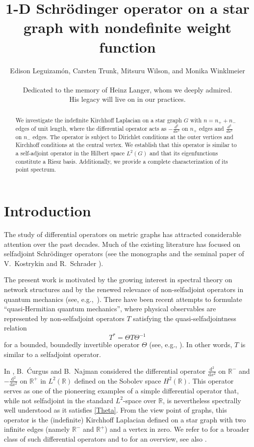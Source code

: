 \documentclass{article}
\title{1-D  Schr\"odinger operator on a star graph with nondefinite weight function}
\author{Edison Leguizam\'on, Carsten Trunk, Mitsuru Wilson, and Monika Winklmeier\\ 
\\
Dedicated to the memory of Heinz Langer, whom we deeply admired.\\
His legacy will live on in our practices.\\
}
\numberwithin{equation}{section}
\theoremstyle{definition}
\newcommand{\R}{\mathbb{R}}
\newcommand{\rd}{\mathrm d} %
\begin{document}
\maketitle
\begin{abstract}
We investigate the indefinite Kirchhoff Laplacian on a star graph \(G\) with \(n = n_+ + n_-\) edges of unit length, where the differential operator acts as \(-\frac{d^2}{dx^2}\) on \(n_+\) edges and \(\frac{d^2}{dx^2}\) on \(n_-\) edges. The operator is subject to Dirichlet conditions at the outer vertices and Kirchhoff conditions at the central vertex. We establish that this operator is similar to a self-adjoint operator in the Hilbert space \(L^2(G)\) and that its eigenfunctions constitute a Riesz basis. Additionally, we provide a complete characterization of its point spectrum.
\end{abstract}

\section{Introduction}
\noindent
The study of differential operators on metric graphs has attracted considerable attention over the past decades. Much of the existing literature has focused on selfadjoint Schr\"{o}dinger operators (see the monographs \cite{BerkolaikoKuchment, BEH08, K24} and the seminal paper of V.\ Kostrykin and R.\ Schrader \cite{KS99}). 

The present work is motivated by the growing interest in spectral theory on network structures and by the renewed relevance of non-selfadjoint operators in quantum mechanics (see, e.g.,\ \cite{HKS15}). There have been recent attempts to formulate “quasi-Hermitian quantum mechanics”, where physical observables are represented by non-selfadjoint operators $T$ satisfying the quasi-selfadjointness relation
\begin{equation}
\label{Theta}
	T^* = \Theta T \Theta^{-1}
\end{equation}
for a bounded, boundedly invertible operator $\Theta$ (see, e.g., \cite{SGH92}). In other words, $T$ is similar to a selfadjoint operator. 

In \cite{CurgusNajman1995}, B.~{\'C}urgus and B.~Najman considered the differential operator $\frac{\rd^2}{\rd x^2}$ on $\R^-$ and $-\frac{\rd^2}{\rd x^2}$ on $\R^+$ in $L^2(\mathbb R)$ defined on the Sobolev space $H^2(\R)$. This operator serves as one of the pioneering examples of a simple differential operator that, while not selfadjoint in the standard $L^2$-space over $\R$, is nevertheless spectrally well understood as it satisfies \eqref{Theta}. From the view point of graphs, this operator is the (indefinite) Kirchhoff Laplacian  defined on a star graph with two infinite edges (namely $\mathbb R^-$ and $\mathbb R^+$) and a vertex in zero. We refer to \cite{CurgusLanger1989} for a broader class of such differential operators and to \cite{F24} for an overview, see also \cite{CDT24}. 
\end{document}
